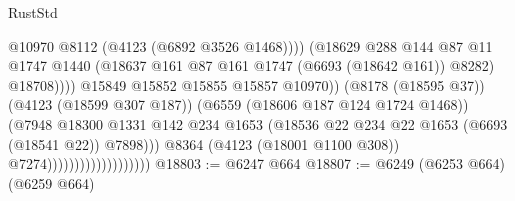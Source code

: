 \begin{lexlean}{RustStd}
\begin{coremodule}
                                                          @10970
                                                          @8112
                                                          (@4123 (@6892 @3526 @1468))))
                                                      (@18629
                                                        @288
                                                        @144
                                                        @87
                                                        @11
                                                        @1747
                                                        @1440
                                                        (@18637
                                                          @161
                                                          @87
                                                          @161
                                                          @1747
                                                          (@6693 (@18642 @161))
                                                          @8282)
                                                        @18708))))
                                                @15849
                                                @15852
                                                @15855
                                                @15857
                                                @10970))
                                            (@8178 (@18595 @37))
                                            (@4123 (@18599 @307 @187))
                                            (@6559 (@18606 @187 @124 @1724 @1468))
                                            (@7948
                                              @18300
                                              @1331
                                              @142
                                              @234
                                              @1653
                                              (@18536
                                                @22
                                                @234
                                                @22
                                                @1653
                                                (@6693 (@18541 @22))
                                                @7898)))
                                          @8364
                                          (@4123 (@18001 @1100 @308))
                                          @7274)))))))))))))))))))
@18803 := @6247 @664
@18807 := @6249 (@6253 @664) (@6259 @664)

\end{coremodule}
\end{lexlean}
